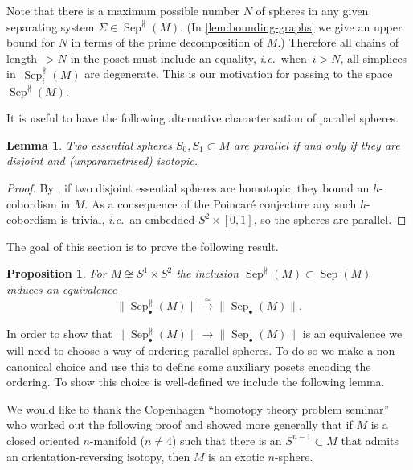 \documentclass{amsart}
\theoremstyle{plain}
\newtheorem{prop}[thm]{Proposition}
\newtheorem{lem}[thm]{Lemma}
\theoremstyle{definition}
\DeclareMathOperator\sep{Sep} %
\newcommand{\sepNP}{\sep^{\nparallel}} %
\begin{document}
Note that there is a maximum possible number $N$ of spheres in any given separating system $\Sigma \in \sepNP(M)$. (In \cref{lem:bounding-graphs} we give an upper bound for $N$ in terms of the prime decomposition of $M$.)
Therefore all chains of length~$> N$ in the poset must include an equality, \emph{i.e.}~when~$i>N$, all simplices in~$\sepNP_i(M)$ are degenerate. This is our motivation for passing to the space $\sepNP(M)$.

It is useful to have the following alternative characterisation of parallel spheres.


\begin{lem}\label{lem:parallel-spheres-bound-cylinder}
    Two essential spheres $S_0, S_1 \subset M$ are parallel if and only if they are disjoint and (unparametrised) isotopic.
\end{lem}
\begin{proof} 
    By \cite[Lemma 2.1]{Laudenbach73}, if two disjoint essential spheres are homotopic, they bound an $h$-cobordism in $M$.
    As a consequence of the Poincar\'e conjecture any such $h$-cobordism is trivial, \emph{i.e.}~an embedded $S^2 \times [0,1]$, so the spheres are parallel.
\end{proof}

The goal of this section is to prove the following result.

\begin{prop}\label{prop - removing parallel spheres is an equivalence}
    For $M \not\cong S^1 \times S^2$ the inclusion $\sepNP(M) \subset \sep(M)$ induces an equivalence 
    \[
    \|\sepNP_\bullet(M)\| \xrightarrow{\ \simeq\ } \|\sep_\bullet(M)\|.
    \]
\end{prop}

In order to show that $\|\sep_\bullet^\nparallel(M)\| \to \|\sep_\bullet(M)\|$ is an equivalence we will need to choose a way of ordering parallel spheres. 
To do so we make a non-canonical choice and use this to define some auxiliary posets encoding the ordering. To show this choice is well-defined we include the following lemma.

We would like to thank the Copenhagen ``homotopy theory problem seminar'' who worked out the following proof and showed more generally that if $M$ is a closed oriented $n$-manifold ($n\neq 4$) such that there is an $S^{n-1} \subset M$ that admits an orientation-reversing isotopy, then $M$ is an exotic $n$-sphere.
\end{document}
